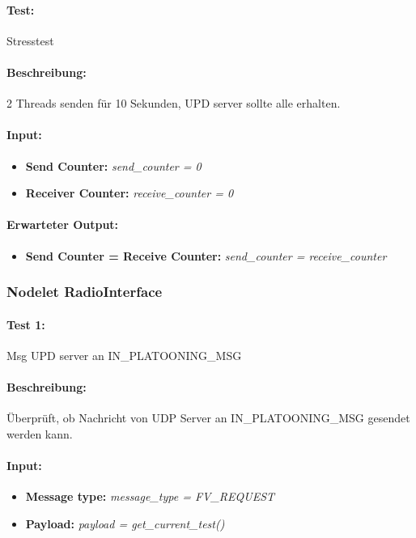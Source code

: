 \documentclass[a4paper, 12pt, titlepage]{scrartcl}
\begin{document}
{			\paragraph{Test:}{Stresstest}
				\paragraph{Beschreibung:} 2 Threads senden für 10 Sekunden, UPD server sollte alle erhalten.
				\paragraph{Input:}
				\begin{itemize} \itemsep-0.5em
					\item \textbf{Send Counter:} \emph{send\_counter = 0}
					\item \textbf{Receiver Counter:} \emph{receive\_counter = 0}
				\end{itemize}
				\paragraph{Erwarteter Output:}
				\begin{itemize} \itemsep-0.5em
					\item \textbf{Send Counter = Receive Counter:} \emph{send\_counter = receive\_counter}
				\end{itemize}

			\subsubsection{Nodelet RadioInterface}
			\label{node_radio_interface}
			\paragraph{Test 1:} {Msg UPD server an IN\_PLATOONING\_MSG}
			\paragraph{Beschreibung:} Überprüft, ob Nachricht von UDP Server an IN\_PLATOONING\_MSG gesendet werden kann.
			\paragraph{Input:}
			\begin{itemize} \itemsep-0.5em
				\item \textbf{Message type:} \emph{message\_type = FV\_REQUEST}
				\item \textbf{Payload:} \emph{payload = get\_current\_test()}
			\end{itemize}
}
\end{document}
